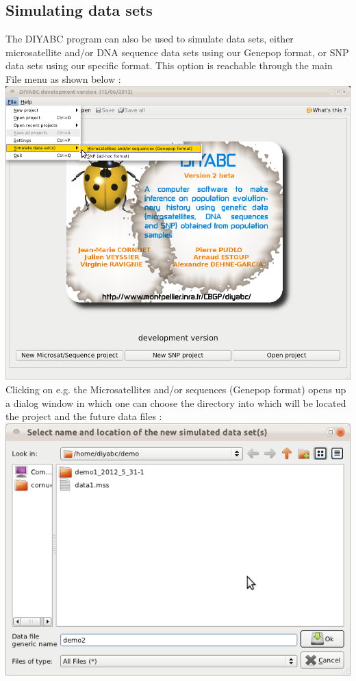 \subsection{Simulating data sets}

The DIYABC program can also be used to simulate data sets, either
microsatellite and/or DNA sequence data sets using our Genepop format,
or SNP data sets using our specific format. This option is reachable
through the main \textsf{File} menu as shown below :\\


\includegraphics[scale=0.33]{gui_pictures/Capture-DIYABC-62} \\


Clicking on e.g. the \textsf{Microsatellites and/or sequences (Genepop
format)} opens up a dialog window in which one can choose the directory
into which will be located the project and the future data files :\\


\includegraphics[scale=0.33]{gui_pictures/Capture-DIYABC-64} \\


